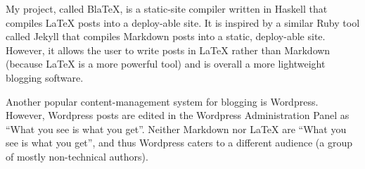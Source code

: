 
My project, called BlaTeX, is a static-site compiler written in Haskell that compiles LaTeX posts into a deploy-able site. It is inspired by a similar Ruby tool called Jekyll that compiles Markdown posts into a static, deploy-able site. However, it allows the user to write posts in LaTeX rather than Markdown (because LaTeX is a more powerful tool) and is overall a more lightweight blogging software. 



Another popular content-management system for blogging is Wordpress. However, Wordpress posts are edited in the Wordpress Administration Panel as ``What you see is what you get''. Neither Markdown nor LaTeX are ``What you see is what you get'', and thus Wordpress caters to a different audience (a group of mostly non-technical authors). 
